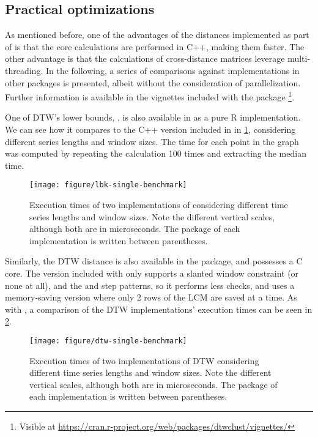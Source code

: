 \subsection{Practical optimizations}
\label{sec:minibench}

As mentioned before,
one of the advantages of the distances implemented as part of \dtwclust{} is that the core calculations are performed in C++,
making them faster.
The other advantage is that the calculations of cross-distance matrices leverage multi-threading.
In the following,
a series of comparisons against implementations in other packages is presented,
albeit without the consideration of parallelization.
Further information is available in the vignettes included with the package%
\footnote{Visible at \url{https://cran.r-project.org/web/packages/dtwclust/vignettes/}}.

One of DTW's lower bounds,
,
is also available in  as a pure R implementation.
We can see how it compares to the C++ version included in \dtwclust{} in \cref{fig:lbk-single-benchmark},
considering different series lengths and window sizes.
The time for each point in the graph was computed by repeating the calculation 100 times and extracting the median time.

\begin{figure}[htbp]

	{\centering \texttt{[image: figure/lbk-single-benchmark]}

	}

	\caption{Execution times of two implementations of  considering different time series lengths and window sizes. Note the different vertical scales, although both are in microseconds. The package of each implementation is written between parentheses.}\label{fig:lbk-single-benchmark}
\end{figure}

Similarly, the DTW distance is also available in the  package,
and possesses a C core.
The  version included with \dtwclust{} only supports a slanted window constraint
(or none at all),
and the  and  step patterns,
so it performs less checks,
and uses a memory-saving version where only 2 rows of the LCM are saved at a time.
As with ,
a comparison of the DTW implementations' execution times can be seen in \cref{fig:dtw-single-benchmark}.

\begin{figure}[htbp]

	{\centering \texttt{[image: figure/dtw-single-benchmark]}

	}

	\caption{Execution times of two implementations of DTW considering different time series lengths and window sizes. Note the different vertical scales, although both are in microseconds. The package of each implementation is written between parentheses.}\label{fig:dtw-single-benchmark}
\end{figure}

